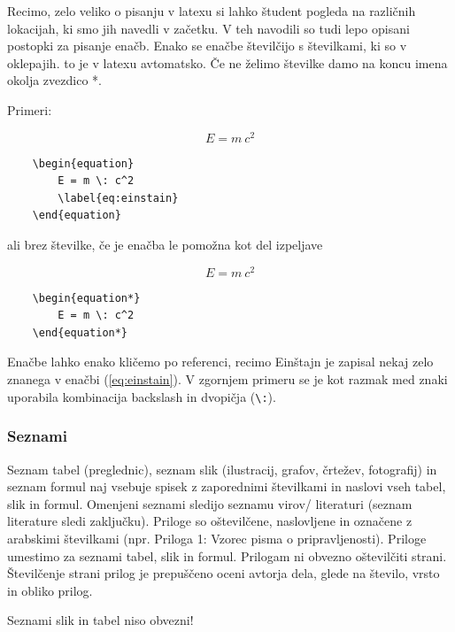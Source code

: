 \documentclass[12pt]{article}
\theoremstyle{definition}
\begin{document}
Recimo, zelo veliko o pisanju v latexu si lahko študent pogleda na različnih lokacijah, ki smo jih navedli v začetku. V teh navodili so tudi lepo opisani postopki za pisanje enačb. Enako se enačbe številčijo s številkami, ki so v oklepajih. to je v latexu avtomatsko. Če ne želimo številke damo na koncu imena okolja zvezdico *.

Primeri:

\begin{equation}
	E = m \: c^2
	\label{eq:einstain}
\end{equation}

\begin{verbatim}
	\begin{equation}
		E = m \: c^2
		\label{eq:einstain}
	\end{equation}
\end{verbatim}

ali brez številke, če je enačba le pomožna kot del izpeljave

\begin{equation*}
	E = m \: c^2
\end{equation*}

\begin{verbatim}
	\begin{equation*}
		E = m \: c^2
	\end{equation*}
\end{verbatim}

Enačbe lahko enako kličemo po referenci, recimo Einštajn je zapisal nekaj zelo znanega v enačbi (\ref{eq:einstain}). V zgornjem primeru se je kot razmak med znaki uporabila kombinacija backslash in dvopičja (\texttt{\textbackslash :}).

\subsubsection{Seznami}

Seznam tabel (preglednic), seznam slik (ilustracij, grafov, črtežev, fotografij) in seznam formul naj vsebuje spisek z zaporednimi številkami in naslovi vseh tabel, slik in formul. Omenjeni seznami sledijo seznamu virov/ literaturi (seznam literature sledi zaključku).
Priloge so oštevilčene, naslovljene in označene z arabskimi številkami (npr. Priloga 1: Vzorec pisma o pripravljenosti). Priloge umestimo za seznami tabel, slik in formul. Prilogam ni obvezno oštevilčiti strani. Številčenje strani prilog je prepuščeno oceni avtorja dela, glede na število, vrsto in obliko prilog.

Seznami slik in tabel niso obvezni!
\end{document}
